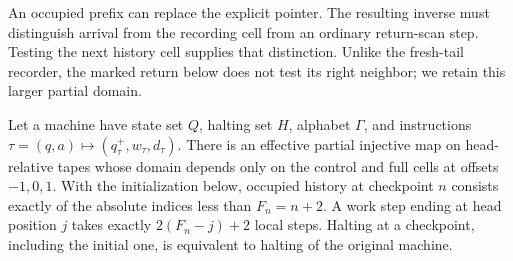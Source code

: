 An occupied prefix can replace the explicit pointer.  The resulting
inverse must distinguish arrival from the recording cell from an
ordinary return-scan step.  Testing the next history cell supplies that
distinction.  Unlike the fresh-tail recorder, the marked return below
does not test its right neighbor; we retain this larger partial domain.

\begin{lemma}
\label{ba:occupied-compiler}
Let a machine have state set $Q$, halting set $H$, alphabet $\Gamma$,
and instructions
$\tau=(q,a)\mapsto(q^+_\tau,w_\tau,d_\tau)$.
There is an effective partial injective map on head-relative tapes
whose domain depends only on the control and full cells at offsets
$-1,0,1$.  With the initialization below, occupied history at checkpoint
$n$ consists exactly of the absolute indices less than $F_n=n+2$.
A work step ending at head position $j$ takes exactly
$2(F_n-j)+2$ local steps.  Halting at a checkpoint, including the initial
one, is equivalent to halting of the original machine.
\end{lemma}

